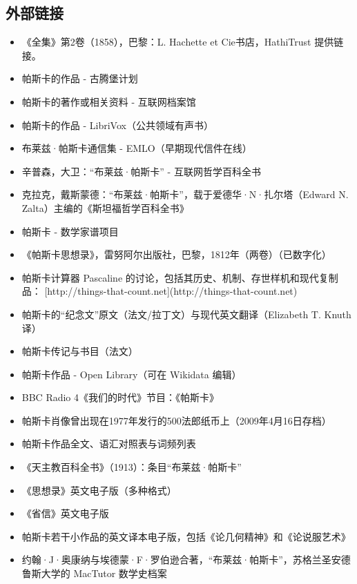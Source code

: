 \subsection{外部链接}
\begin{itemize}
\item 《全集》第2卷（1858），巴黎：L. Hachette et Cie书店，HathiTrust 提供链接。
\item 帕斯卡的作品 - 古腾堡计划
\item 帕斯卡的著作或相关资料 - 互联网档案馆
\item 帕斯卡的作品 - LibriVox（公共领域有声书）
\item 布莱兹·帕斯卡通信集 - EMLO（早期现代信件在线）
\item 辛普森，大卫：“布莱兹·帕斯卡” - 互联网哲学百科全书
\item 克拉克，戴斯蒙德：“布莱兹·帕斯卡”，载于爱德华·N·扎尔塔（Edward N. Zalta）主编的《斯坦福哲学百科全书》
\item 帕斯卡 - 数学家谱项目
\item 《帕斯卡思想录》，雷努阿尔出版社，巴黎，1812年（两卷）（已数字化）
\item 帕斯卡计算器 Pascaline 的讨论，包括其历史、机制、存世样机和现代复制品： [http://things-that-count.net](http://things-that-count.net)
\item 帕斯卡的“纪念文”原文（法文/拉丁文）与现代英文翻译（Elizabeth T. Knuth 译）
\item 帕斯卡传记与书目（法文）
\item 帕斯卡作品 - Open Library（可在 Wikidata 编辑）
\item BBC Radio 4《我们的时代》节目：《帕斯卡》
\item 帕斯卡肖像曾出现在1977年发行的500法郎纸币上（2009年4月16日存档）
\item 帕斯卡作品全文、语汇对照表与词频列表
\item 《天主教百科全书》（1913）：条目“布莱兹·帕斯卡”
\item 《思想录》英文电子版（多种格式）
\item 《省信》英文电子版
\item 帕斯卡若干小作品的英文译本电子版，包括《论几何精神》和《论说服艺术》
\item 约翰·J·奥康纳与埃德蒙·F·罗伯逊合著，“布莱兹·帕斯卡”，苏格兰圣安德鲁斯大学的 MacTutor 数学史档案
\end{itemize}